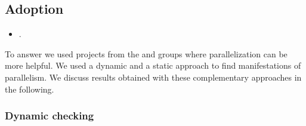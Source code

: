 \documentclass[10pt,journal,compsoc]{IEEEtran}
\begin{document}
\subsection{Adoption}
\label{sec:rqC}
\label{sec:rqE}

\begin{itemize}
    \item \numRQAdoptionOne. \textbf{\RQAdoptionOne{}}
\end{itemize}

To answer \numRQAdoptionOne{} we used projects from the \medg{} and
\longg{} groups where parallelization can be more helpful. We used a
dynamic and a static approach to find manifestations of
parallelism. We discuss results obtained with these complementary
approaches in the following.

\subsubsection{Dynamic checking}
\label{sec:rqC-1}
\end{document}
